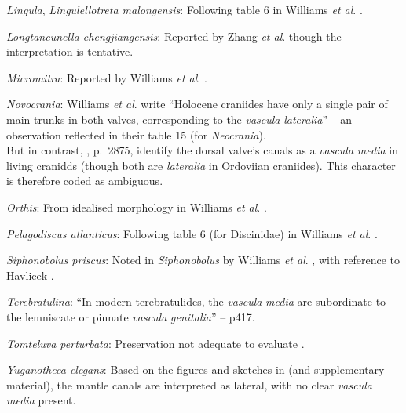 \documentclass[openany]{book}
\theoremstyle{definition}
\theoremstyle{definition}
\theoremstyle{definition}
\theoremstyle{remark}
\begin{document}
\hypertarget{Lingula-coding-94}{}
\emph{Lingula}, \emph{Lingulellotreta malongensis}: Following table 6 in
Williams \emph{et al}.
\citeyearpar{Williams2000LinguliformeaCraniiformea}.

\hypertarget{Longtancunella_chengjiangensis-coding-94}{}
\emph{Longtancunella chengjiangensis}: Reported by Zhang \emph{et al}.
\citeyearpar{Zhang2007Agregarious} though the interpretation is
tentative.

\hypertarget{Micromitra-coding-94}{}
\emph{Micromitra}: Reported by Williams \emph{et al}.
\citeyearpar{Williams1998Thediversity}.

\hypertarget{Novocrania-coding-94}{}
\emph{Novocrania}: Williams \emph{et al}.
\citeyearpar{Williams2000LinguliformeaCraniiformea} write ``Holocene
craniides have only a single pair of main trunks in both valves,
corresponding to the \emph{vascula} \emph{lateralia}'' -- an observation
reflected in their table 15 (for \emph{Neocrania}).\\
But in contrast, \citet{Williams2007Supplement}, p.~2875, identify the
dorsal valve's canals as a \emph{vascula} \emph{media} in living
cranidds (though both are \emph{lateralia} in Ordoviian craniides). This
character is therefore coded as ambiguous.

\hypertarget{Orthis-coding-94}{}
\emph{Orthis}: From idealised morphology in Williams \emph{et al}.
\citeyearpar{Williams2000LinguliformeaCraniiformea}.

\hypertarget{Pelagodiscus_atlanticus-coding-94}{}
\emph{Pelagodiscus atlanticus}: Following table 6 (for Discinidae) in
Williams \emph{et al}.
\citeyearpar{Williams2000LinguliformeaCraniiformea}.

\hypertarget{Siphonobolus_priscus-coding-94}{}
\emph{Siphonobolus priscus}: Noted in \emph{Siphonobolus} by Williams
\emph{et al}. \citeyearpar{Williams2000LinguliformeaCraniiformea}, with
reference to Havlicek \citeyearpar{Havlicek1982LingulaceaPaterinacea}.

\hypertarget{Terebratulina-coding-94}{}
\emph{Terebratulina}: ``In modern terebratulides, the \emph{vascula}
\emph{media} are subordinate to the lemniscate or pinnate \emph{vascula}
\emph{genitalia}'' -- \citet{Williams1997Introduction} p417.

\hypertarget{Tomteluva_perturbata-coding-94}{}
\emph{Tomteluva perturbata}: Preservation not adequate to evaluate
\citep{Streng2016Anew}.

\hypertarget{Yuganotheca_elegans-coding-94}{}
\emph{Yuganotheca elegans}: Based on the figures and sketches in
\citet{Zhang2014Anearly} (and supplementary material), the mantle canals
are interpreted as lateral, with no clear \emph{vascula} \emph{media}
present.
\end{document}
